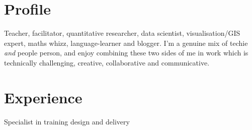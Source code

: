 \documentclass[a4paper,nomath]{deedy-resume} %
\begin{document}

\lastupdated %


%
\begin{minipage}[t]{0.66\textwidth} %


    \section{Profile}
    Teacher, facilitator, quantitative researcher, data scientist, visualisation/GIS expert, maths whizz, language-learner and blogger.
    I'm a genuine mix of techie \textit{and} people person, and enjoy combining these two sides of me in work which is technically challenging, creative, collaborative and communicative.


    \section{Experience}


    \vspace{\topsep} %
    \begin{tightitemize}
    	
    	\item Specialist in training design and delivery
    	

\end{tightitemize}
\end{minipage}
\end{document}
